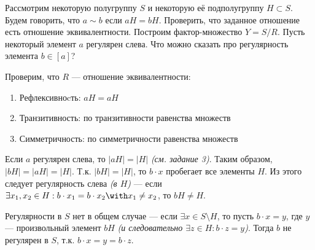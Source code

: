 \begin{exercise}
    Рассмотрим некоторую полугруппу \(S\) и некоторую её подполугруппу \(H \subset S\). Будем говорить, что \(a \sim b\) если \(aH = bH\). Проверить, что заданное отношение есть отношение эквивалентности. Построим фактор-множество \(Y = S/R\). Пусть некоторый элемент \(a\) регулярен слева. Что можно сказать про регулярность элемента \(b \in [a]\)?
\end{exercise}
\begin{solution}
    Проверим, что \(R\) --- отношение эквивалентности:
    \begin{enumerate}
        \item Рефлексивноcть: \(aH = aH\)
        \item Транзитивность: по транзитивности равенства множеств
        \item Симметричность: по симметричности равенства множеств
    \end{enumerate}

    Если \(a\) регулярен слева, то \(|aH| = |H|\) \textit{(см. задание 3)}. Таким образом, \(|bH| = |aH| = |H|\). Т.к. \(|bH| = |H|\), то \(b \cdot x\) пробегает все элементы \(H\). Из этого следует регулярность слева \textit{(в \(H\))} --- если \(\exists x_1, x_2 \in H : b \cdot x_1 = b \cdot x_2 \with x_1 \neq x_2\), то \(bH \neq H\).

    Регулярности в \(S\) нет в общем случае --- если \(\exists x \in S \setminus H\), то пусть \(b \cdot x = y\), где \(y\) --- произвольный элемент \(bH\) \textit{(и следовательно \(\exists z \in H : b \cdot z = y\))}. Тогда \(b\) не регулярен в \(S\), т.к. \(b \cdot x = y = b \cdot z\).
\end{solution}

